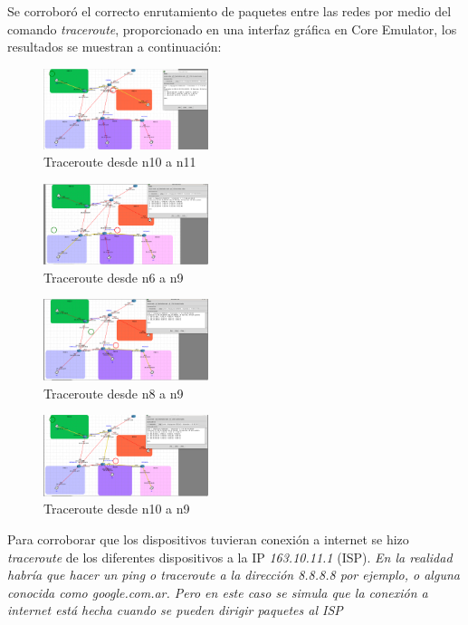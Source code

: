 \documentclass[letterpaper, 10 pt, conference]{ieeeconf}  %
\begin{document}
Se corroboró el correcto enrutamiento de paquetes entre las redes por medio del comando \textit{traceroute}, proporcionado en una interfaz gráfica en Core Emulator, los resultados se muestran a continuación:


\begin{figure}[H]
	\centering
	\includegraphics[width=0.43\textwidth]{./Imagenes/traceroute_1.png}
	\caption{Traceroute desde n10 a n11}
\end{figure}
\begin{figure}[H]
	\centering
	\includegraphics[width=0.43\textwidth]{./Imagenes/traceroute_2.png}
	\caption{Traceroute desde n6 a n9}
\end{figure}
\begin{figure}[H]
	\centering
	\includegraphics[width=0.43\textwidth]{./Imagenes/traceroute_3.png}
	\caption{Traceroute desde n8 a n9}
\end{figure}
\begin{figure}[H]
	\centering
	\includegraphics[width=0.43\textwidth]{./Imagenes/traceroute_4.png}
	\caption{Traceroute desde n10 a n9}
\end{figure}

Para corroborar que los dispositivos tuvieran conexión a internet se hizo \textit{traceroute} de los diferentes dispositivos a la IP \textit{163.10.11.1} (ISP).
\textit{En la realidad habría que hacer un ping o traceroute a la dirección 8.8.8.8 por ejemplo, o alguna conocida como google.com.ar. Pero en este caso se simula que la conexión a internet está hecha cuando se pueden dirigir paquetes al ISP}
\end{document}
